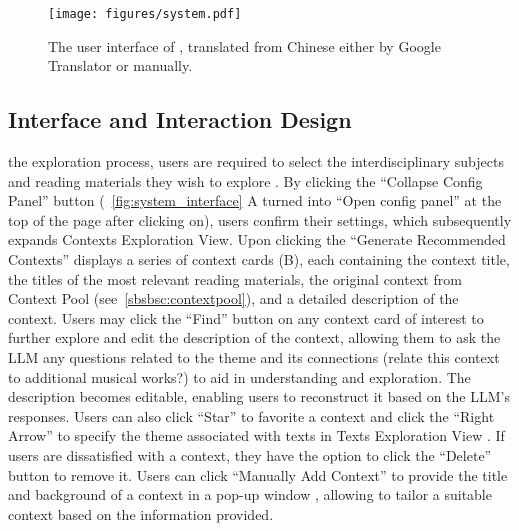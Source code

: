 \begin{figure*}[ht]
  \centering
  \texttt{[image: figures/system.pdf]}
  \caption{The user interface of \name{}, translated from Chinese either by Google Translator or manually.}
\label{fig:system_interface}
\end{figure*}

\subsection{\name{} Interface and Interaction Design}
the exploration process, users are required to select the interdisciplinary subjects and reading materials they wish to explore .
By clicking the ``Collapse Config Panel'' button (~\autoref{fig:system_interface} A turned into ``Open config panel'' at the top of the page after clicking on), users confirm their settings, which subsequently expands Contexts Exploration View. Upon clicking the ``Generate Recommended Contexts''  displays a series of context cards (B), each containing the context title, the titles of the most relevant reading materials, the original context from Context Pool (see~\autoref{sbsbsc:contextpool}), and a detailed description of the context.
Users may click the ``Find'' button on any context card of interest to further explore and edit the description of the context, allowing them to ask the LLM any questions   related to the theme and its connections (\eg relate this context to additional musical works?) to aid in understanding and exploration. The description becomes editable, enabling users to reconstruct it based on the LLM's responses. Users can also click ``Star'' to favorite a context and click the ``Right Arrow'' to specify the theme associated with texts in Texts Exploration View  . 
If users are dissatisfied with a context, they have the option to click the ``Delete'' button to remove it. Users can click ``Manually Add Context'' to provide the title and background of a context in a pop-up window , allowing \name{} to tailor a suitable context based on the information provided.

